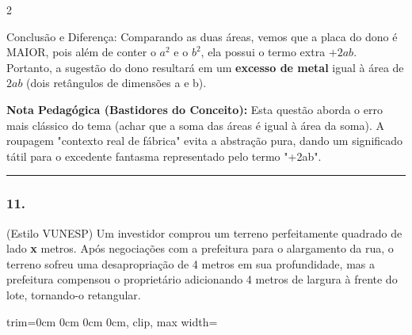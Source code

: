 \begin{multicols*}{2}
\begin{tcolorbox}[colback=CorTitUm!5, colframe=CorTitUm, boxrule=1pt, arc=4pt, left=6pt, right=6pt, top=6pt, bottom=6pt]
    Conclusão e Diferença:
    Comparando as duas áreas, vemos que a placa do dono é MAIOR, pois além de conter o $ a^2 $ e o $ b^2 $, ela possui o termo extra $ + 2ab $. 
    Portanto, a sugestão do dono resultará em um \textbf{excesso de metal} igual à área de $ 2ab $ (dois retângulos de dimensões a e b).
    \end{tcolorbox}
    \vspace{0.15cm}
    
    \begin{boxexplicacao}
    \textbf{Nota Pedagógica (Bastidores do Conceito):} Esta questão aborda o erro mais clássico do tema (achar que a soma das áreas é igual à área da soma). A roupagem "contexto real de fábrica" evita a abstração pura, dando um significado tátil para o excedente fantasma representado pelo termo "+2ab".
    \end{boxexplicacao}
\fi

\par\vspace{\espacoQuestao}
\noindent\textcolor{CorLinha}{\rule{\linewidth}{0.5pt}} 
\par\vspace{\espacoPreQuestao}
\subsubsection*{11.} 
\begin{enunciadoLiteral}
(Estilo VUNESP) Um investidor comprou um terreno perfeitamente quadrado de lado \textbf{x} metros. Após negociações com a prefeitura para o alargamento da rua, o terreno sofreu uma desapropriação de 4 metros em sua profundidade, mas a prefeitura compensou o proprietário adicionando 4 metros de largura à frente do lote, tornando-o retangular.

\begin{center}
\begin{adjustbox}{trim=0cm 0cm 0cm 0cm, clip, max width=\larguraTikz}
\end{adjustbox}
\end{center}
\end{enunciadoLiteral}
\end{multicols*}
